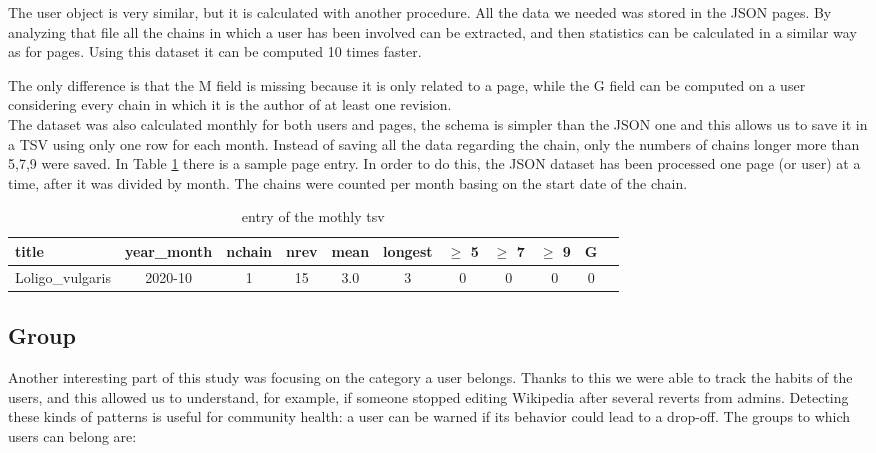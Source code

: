 The user object is very similar, but it is calculated with another procedure. All the data we needed
was stored in the JSON pages. By analyzing that file all the chains in which a user has been
involved can be extracted, and then statistics can be calculated in a similar way as for pages.
Using this dataset it can be computed 10 times faster.  

The only difference is that the M field is missing because it is only related to a page, while the G field
can be computed on a user considering every chain in which it is the author of at least one revision.\\

The dataset was also calculated monthly for both users and pages, the schema is simpler than the
JSON one and this allows us to save it in a TSV using only one row for each month. Instead of saving
all the data regarding the chain, only the numbers of chains longer more than 5,7,9 were saved. In
Table \ref{table:chainsPagemonth} there is a sample page entry. In order to do this, the JSON
dataset has been processed one page (or user) at a time, after it was divided by month. The chains
were counted per month basing on the start date of the chain.   

\begin{table}[H]
    \centering
    \begin{tabularx}{\columnwidth}{@{}Xcccccccccc@{}}
        \midrule
        \textbf{title} & \textbf{year\_month} & \textbf{nchain} & \textbf{nrev} & \textbf{mean} & \textbf{longest} & \textbf{$\geq$ 5} & \textbf{$\geq$ 7} & \textbf{$\geq$ 9} & \textbf{G}\\ \toprule
        Loligo\_vulgaris & 2020-10 & 1 & 15 & 3.0 & 3 & 0 & 0 & 0 & 0\\
        
        \bottomrule
    \end{tabularx}
    
    \caption{entry of the mothly tsv \label{table:chainsPagemonth}}
\end{table}


\subsection{Group}
Another interesting part of this study was focusing on the category a user belongs. Thanks to this
we were able to track the habits of the users, and this allowed us to understand, for example, if
someone stopped editing Wikipedia after several reverts from admins. Detecting these kinds of
patterns is useful for community health: a user can be warned if its behavior could lead to a
drop-off. The groups to which users can belong are: 


